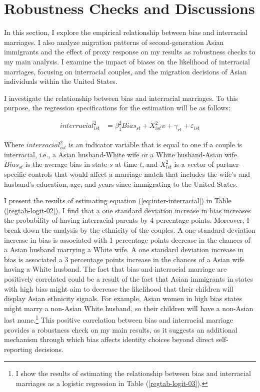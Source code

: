 \section{Robustness Checks and Discussions} %
\label{sec:robcheck}

In this section, I explore the empirical relationship between bias and interracial marriages. I also analyze migration patterns of second-generation Asian immigrants and the effect of proxy response on my results as robustness checks to my main analysis. I examine the impact of biases on the likelihood of interracial marriages, focusing on interracial couples, and the migration decisions of Asian individuals within the United States. 

I investigate the relationship between bias and interracial marriages. To this purpose, the regression specifications for the estimation will be as follows:

\begin{align}
interracial_{ist}^2 &= \beta_1^2 Bias_{st} + X_{ist}^2\pi + \gamma_{rt} 
            + \varepsilon_{ist}  \label{eq:inter-interracial} 
\end{align}

Where $interracial_{ist}^2$ is an indicator variable that is equal to one if a couple is interracial, i.e., a Asian husband-White wife or a White husband-Asian wife. $Bias_{st}$ is the average bias in state $s$ at time $t$, and $X_{ist}^2$ is a vector of partner-specific controls that would affect a marriage match that includes the wife's and husband's education, age, and years since immigrating to the United States. 

I present the results of estimating equation (\ref{eq:inter-interracial}) in Table (\ref{regtab-logit-02}). I find that a one standard deviation increase in bias increases the probability of having interracial parents by 4 percentage points. Moreover, I break down the analysis by the ethnicity of the couples. A one standard deviation increase in bias is associated with 1 percentage points decrease in the chances of a Asian husband marrying a White wife. A one standard deviation increase in bias is associated a 3 percentage points increase in the chances of a Asian wife having a White husband. The fact that bias and interracial marriage are positively correlated could be a result of the fact that Asian immigrants in states with high bias might aim to decrease the likelihood that their children will display Asian ethnicity signals. For example, Asian women in high bias states might marry a non-Asian White husband, so their children will have a non-Asian last name.\footnote{I show the results of estimating the relationship between bias and interracial marriages as a logistic regression in Table (\ref{regtab-logit-03}).} This positive correlation between bias and interracial marriage provides a robustness check on my main results, as it suggests an additional mechanism through which bias affects identity choices beyond direct self-reporting decisions.

